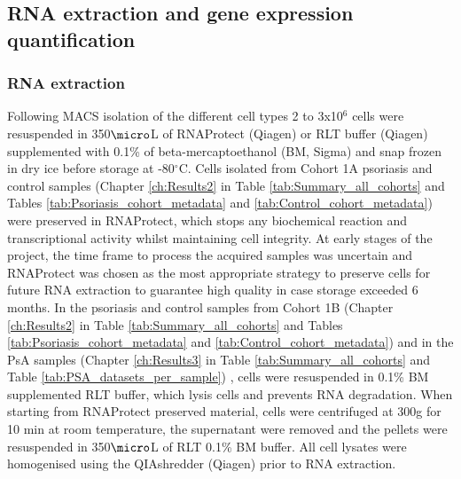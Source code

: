 

\subsection{RNA extraction and gene expression quantification}

\subsubsection{RNA extraction}
Following MACS isolation of the different cell types 2 to 3x10$^6$ cells were resuspended in 350$\micro$L of RNAProtect (Qiagen) or RLT buffer (Qiagen) supplemented with 0.1\% of beta-mercaptoethanol (BM, Sigma) and snap frozen in dry ice before storage at -80{$^\circ$}C. Cells isolated from Cohort 1A psoriasis and control samples (Chapter \ref{ch:Results2} in Table \ref{tab:Summary_all_cohorts} and Tables \ref{tab:Psoriasis_cohort_metadata} and \ref{tab:Control_cohort_metadata}) were preserved in RNAProtect, which stops any biochemical reaction and transcriptional activity whilst maintaining cell integrity. At early stages of the project, the time frame to process the acquired samples was uncertain and RNAProtect was chosen as the most appropriate strategy to preserve cells for future RNA extraction to guarantee high quality in case storage exceeded 6 months. In the psoriasis and control samples from Cohort 1B (Chapter \ref{ch:Results2} in Table \ref{tab:Summary_all_cohorts} and Tables \ref{tab:Psoriasis_cohort_metadata} and \ref{tab:Control_cohort_metadata}) and in the PsA samples (Chapter \ref{ch:Results3} in Table \ref{tab:Summary_all_cohorts} and Table \ref{tab:PSA_datasets_per_sample}) , cells were resuspended in 0.1\% BM supplemented RLT buffer, which lysis cells and prevents RNA degradation. When starting from RNAProtect preserved material, cells were centrifuged at 300g for 10 min at room temperature, the supernatant were removed and the pellets were resuspended in 350$\micro$L of RLT 0.1\% BM buffer. All cell lysates were homogenised using the QIAshredder (Qiagen) prior to RNA extraction.

